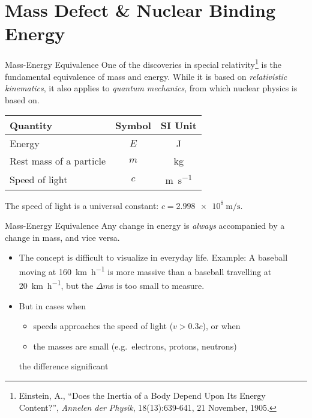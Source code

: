 \documentclass[12pt,compress,aspectratio=169]{beamer}
\newcommand{\eq}[2]{
  \vspace{#1}{\Large\begin{displaymath}#2\end{displaymath}}
}
\begin{document}
\section{Mass Defect \& Nuclear Binding Energy}

\begin{frame}{Mass-Energy Equivalence}
  One of the discoveries in special relativity\footnote{Einstein, A., ``Does
    the Inertia of a Body Depend Upon Its Energy Content?'', \emph{Annelen der
    Physik}, 18(13):639-641, 21 November, 1905.} is the fundamental equivalence
  of mass and energy. While it is based on \emph{relativistic kinematics}, it
  also applies to \emph{quantum mechanics}, from which nuclear physics is based
  on.
  
  \eq{-.2in}{
    \boxed{E=mc^2}
  }
  \begin{center}
    \begin{tabular}{l|c|c}
      \rowcolor{pink}
      \textbf{Quantity} & \textbf{Symbol} & \textbf{SI Unit} \\ \hline
      Energy                  & $E$ & \si{\joule}\\
      Rest mass of a particle & $m$ & \si{\kilo\gram}\\
      Speed of light          & $c$ & \si{\metre\per\second}
    \end{tabular}
  \end{center}
  The speed of light is a universal constant:
  $c=\SI{2.998e8}{\metre\per\second}$.
  \vspace{.2in}
\end{frame}




\begin{frame}{Mass-Energy Equivalence}
  Any change in energy is \emph{always} accompanied by a change in mass, and
  vice versa.
  
  \eq{-.2in}{
    E=mc^2\quad\longrightarrow\quad\Delta E=\Delta mc^2
  }

  \begin{itemize}
  \item\vspace{-.15in}The concept is difficult to visualize in everyday life.
    Example: A baseball moving at \SI{160}{\kilo\metre\per\hour} is more
    massive than a baseball travelling at \SI{20}{\kilo\metre\per\hour}, but
    the $\Delta m$s is too small to measure.
  \item But in cases when
    \begin{itemize}
      \item speeds approaches the speed of light ($v>0.3c$), or when
      \item the masses are small (e.g.\ electrons, protons, neutrons)
    \end{itemize}
    the difference significant
  \end{itemize}
\end{frame}
\end{document}
